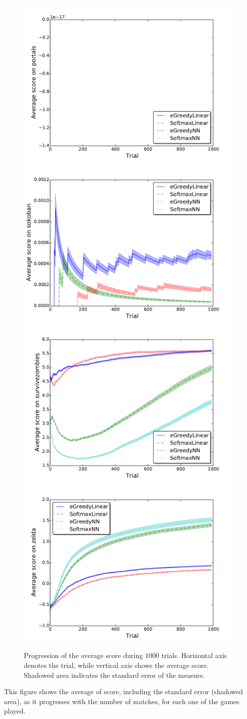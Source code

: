 \documentclass[conference]{IEEEtran}
\begin{document}
\begin{figure}[ht]
\begin{center}
	\vspace{-3.5mm}
	\includegraphics[width = .36\textwidth]{img/portals_scores}
	\includegraphics[width = .36\textwidth]{img/sokoban_scores}\\

	\vspace{-3.5mm}
	\includegraphics[width = .36\textwidth]{img/survivezombies_scores}
	\includegraphics[width = .36\textwidth]{img/zelda_scores}\\

	\vspace{-1mm}
	\caption{Progression of the average score during $1000$ trials. Horizontal axis denotes the trial, while vertical axis shows the average score. Shadowed area indicates the standard error of the measure.}
	\label{fig:results}
	\end{center}
\end{figure}

This figure shows the average of score, including the standard error (shadowed area), as it progresses with the number of matches, for each one of the games played.
\end{document}
